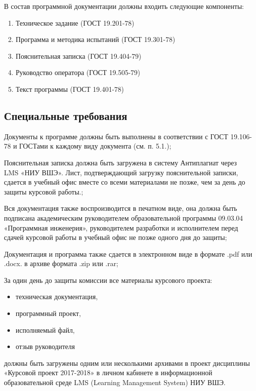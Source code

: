 \documentclass{../includes/TechDoc}
\begin{document}
    В состав программной документации должны входить следующие компоненты:
    \begin{enumerate}
        \item Техническое задание (ГОСТ 19.201-78)
        \item Программа и методика испытаний (ГОСТ 19.301-78)
        \item Пояснительная записка (ГОСТ 19.404-79)
        \item Руководство оператора (ГОСТ 19.505-79)
        \item Текст программы (ГОСТ 19.401-78)
    \end{enumerate}

    \subsection{Специальные требования}

    Документы к программе должны быть выполнены в соответствии с ГОСТ 19.106-78 и ГОСТами к каждому виду документа (см. п. 5.1.);

    Пояснительная записка должна быть загружена в систему Антиплагиат через LMS «НИУ ВШЭ». Лист, подтверждающий загрузку пояснительной записки, сдается в учебный офис вместе со всеми материалами не позже, чем за день до защиты курсовой работы.;

    Вся документация также воспроизводится в печатном виде, она должна быть подписана академическим руководителем образовательной программы 09.03.04 «Программная инженерия», руководителем разработки и исполнителем перед сдачей курсовой работы в учебный офис не позже одного дня до защиты;

    Документация и программа также сдается в электронном виде в формате .pdf или .docx. в архиве формата .zip или .rar;

    За один день до защиты комиссии все материалы курсового проекта:
    \begin{itemize}
        \item техническая документация,
        \item программный проект,
        \item исполняемый файл,
        \item отзыв руководителя
    \end{itemize}
    должны быть загружены одним или несколькими архивами в проект дисциплины «Курсовой проект 2017-2018» в личном кабинете в информационной образовательной среде LMS (Learning Management System) НИУ ВШЭ.
\end{document}
